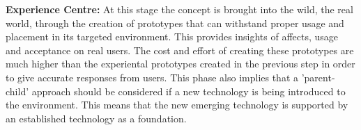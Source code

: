 \textbf{Experience Centre:}
 At this stage the concept is brought into the wild, the real world, through the creation of prototypes that can withstand proper usage and placement in its targeted environment. This provides insights of affects, usage and acceptance on real users. The cost and effort of creating these prototypes are much higher than the experiental prototypes created in the previous step in order to give accurate responses from users. This phase also implies that a 'parent-child' approach should be considered if a new technology is being introduced to the environment. This means that the new emerging technology is supported by an established technology as a foundation.
